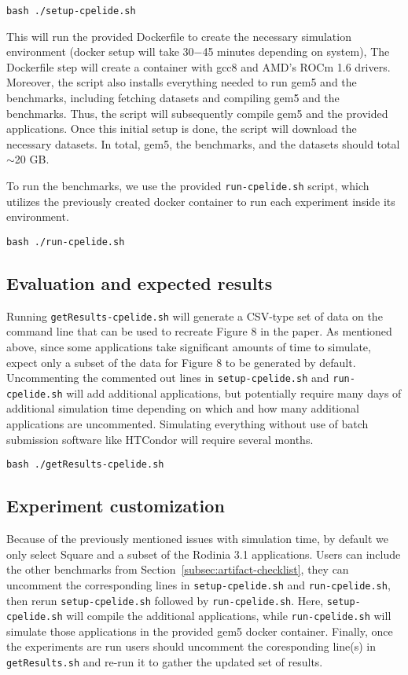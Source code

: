 \documentclass{sigplanconf}
\begin{document}
\noindent
\texttt{bash ./setup-cpelide.sh}

This will run the provided Dockerfile to create the necessary simulation environment (docker setup will take 30$-$45 minutes depending on system),
The Dockerfile step will create a container with gcc8 and AMD's ROCm 1.6 drivers.
Moreover, the script also installs everything needed to run gem5 and the benchmarks, including fetching datasets and compiling gem5 and the benchmarks.
Thus, the script will subsequently compile gem5 and the provided applications.
Once this initial setup is done, the script will download the necessary datasets.
In total, gem5, the benchmarks, and the datasets should total $\sim$20 GB.

To run the benchmarks, we use the provided \texttt{run-cpelide.sh} script, which utilizes the previously created docker container to run each experiment inside its environment.

\noindent
\texttt{bash ./run-cpelide.sh}

\subsection{Evaluation and expected results}
\label{subsec:artifact-res}


Running \texttt{getResults-cpelide.sh} will generate a CSV-type set of data on the command line that can be used to recreate Figure 8 in the paper.
As mentioned above, since some applications take significant amounts of time to simulate, expect only a subset of the data for Figure 8 to be generated by default.
Uncommenting the commented out lines in \texttt{setup-cpelide.sh} and \texttt{run-cpelide.sh} will add additional applications, but potentially require many days of additional simulation time depending on which and how many additional applications are uncommented.
Simulating everything without use of batch submission software like HTCondor will require several months.

\noindent
\texttt{bash ./getResults-cpelide.sh}

\subsection{Experiment customization}
\label{subsec:artifact-custom}

Because of the previously mentioned issues with simulation time, by default we only select Square and a subset of the Rodinia 3.1 applications.
Users can include the other benchmarks from Section~\ref{subsec:artifact-checklist}, they can uncomment the corresponding lines in \texttt{setup-cpelide.sh} and \texttt{run-cpelide.sh}, then rerun \texttt{setup-cpelide.sh} followed by \texttt{run-cpelide.sh}.
Here, \texttt{setup-cpelide.sh} will compile the additional applications, while \texttt{run-cpelide.sh} will simulate those applications in the provided gem5 docker container.
Finally, once the experiments are run users should uncomment the coresponding line(s) in \texttt{getResults.sh} and re-run it to gather the updated set of results.
\end{document}
